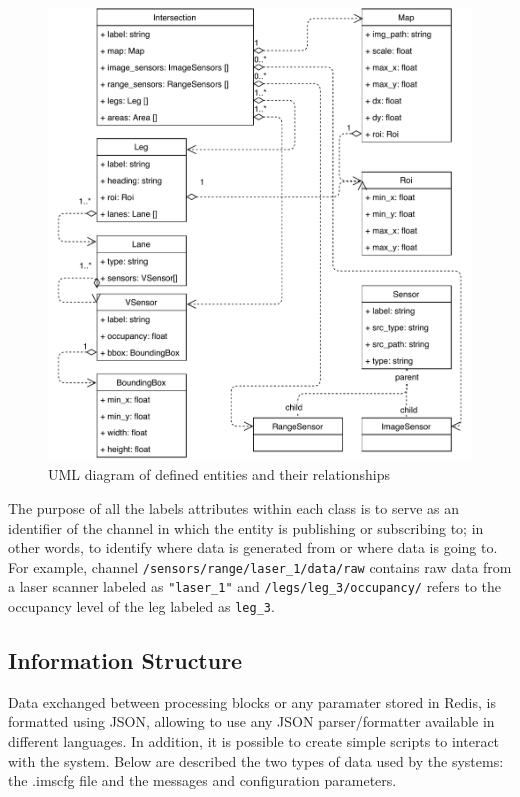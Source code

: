 \begin{figure}[ht!]
\centering
\includegraphics[scale=0.75]{fig/3/data_modelA.pdf}
\caption{UML diagram of defined entities and their relationships}
\label{data_model}
\end{figure}

The purpose of all the labels attributes within each class is to serve as an identifier of the channel in which the entity is publishing or subscribing to; in other words, to identify where data is generated from or where data is going to. For example, channel \texttt{/sensors/range/laser\_1/data/raw} contains raw data from a laser scanner labeled as \texttt{"laser\_1"} and \texttt{/legs/leg\_3/occupancy/} refers to the occupancy level of the leg labeled as \texttt{leg\_3}.

\subsection{Information Structure}


Data exchanged between processing blocks or any paramater stored in Redis, is formatted using JSON, allowing to use any JSON parser/formatter available in different languages. In addition,  it is possible to create simple scripts to interact with the system. Below are described the two types of data used by the systems: the .imscfg file and the messages and configuration parameters.

